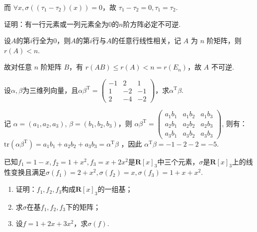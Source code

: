 \begin{exercise}
\begin{exgroup}
\begin{answer}
            而 $\forall x, \sigma((\tau_1-\tau_2)(x))=0$，故 $\tau_1-\tau_2=0, \tau_1=\tau_2$.
        \end{answer}

        \item 证明：有一行元素或一列元素全为0的$n$阶方阵必定不可逆.
        \begin{answer}
            设$A$的第$i$行全为0，则$A$的第$i$行与$A$的任意行线性相关，记 $A$ 为 $n$ 阶矩阵，则$r(A) < n$.

            故对任意 $n$ 阶矩阵 $B$，有 $r(AB) \leq r(A) < n = r(E_n)$，故 $A$ 不可逆.
        \end{answer}

        \item 设$\alpha,\beta$为三维列向量，且$\alpha\beta^\mathrm{T}=\begin{pmatrix}
                -1 & 2  & 1  \\
                1  & -2 & -1 \\
                2  & -4 & -2
            \end{pmatrix}$，求$\alpha^\mathrm{T}\beta$.
        \begin{answer}
            记 $\alpha = (a_1,a_2,a_3)$, $\beta = (b_1,b_2,b_3)$，则 $\alpha\beta^\mathrm{T} = \begin{pmatrix}
                    a_1b_1 & a_1b_2 & a_1b_3 \\
                    a_2b_1 & a_2b_2 & a_2b_3 \\
                    a_3b_1 & a_3b_2 & a_3b_3
                \end{pmatrix}$,
            则有：$\text{tr}(\alpha\beta^\mathrm{T}) = a_1b_1+a_2b_2+a_3b_3 = \alpha^\mathrm{T}\beta$ ，因此 $\alpha^\mathrm{T}\beta = -1-2-2 = -5$.
        \end{answer}
    \end{exgroup}

    \begin{exgroup}
        \item 已知$f_1=1-x,f_2=1+x^2,f_3=x+2x^2$是$\mathbf{R}[x]_3$中三个元素，$\sigma$是$\mathbf{R}[x]_3$上的线性变换且满足$\sigma(f_1)=2+x^2,\sigma(f_2)=x,\sigma(f_3)=1+x+x^2$.
        \begin{enumerate}
            \item 证明：$f_1,f_2,f_3$构成$\mathbf{R}[x]_3$的一组基；

            \item 求$\sigma$在基$f_1,f_2,f_3$下的矩阵；

            \item 设$f=1+2x+3x^2$，求$\sigma(f)$.
        \end{enumerate}


\end{exgroup}
\end{exercise}
